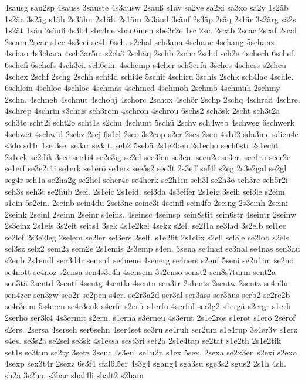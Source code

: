 {4sausg
sau2sp
4sauss
3sauste
4s3ausw
2sauß
s1av
sa2ve
sa2xi
sa3xo
sa2y
1s2äb
1s2äc
3s2äg
s1äh
2s3ähn
2s1ält
2s1äm
2s3änd
3sänf
2s3äp
2säq
2s1är
3s2ärg
sä2s
1s2ät
1säu
2säuß
4s3b4
sba4ne
sbau6men
sbe3r2e
1sc
2sc.
2scab
2scac
2scaf
2scal
2scam
2scar
s1ce
4s3cei
sc4h
6sch.
s2chal
sch3ana
4schanc
4schang
5schanz
4schao
4s3chara
4sch3ar5m
s2chä
2schäq
2schb
2schc
2schd
sch2e
4schech
6schef.
6schefi
6schefs
4sch3ei.
sch6ein.
4schemp
s4cher
sch5erfü
3sches
4schess
s2cheu
4schex
2schf
2schg
2schh
schi4d
schi4e
5schif
4schiru
3schis
2schk
sch4lac
4schle.
6schlein
4schloc
4schlöc
4schmas
4schmed
4schmoh
2schmö
4schmüh
2schmy
2schn.
4schneb
4schnut
4schobj
4schorc
2schox
4schör
2schp
2schq
4schrad
4schre.
4schrep
4schrin
s3chris
sch3rom
4schron
4schrou
6schs2
sch3sk
2scht
sch3t2a
sch3te
scht2i
scht2o
scht1s
s2chu
4schunt
5schü
2schv
sch4web
4schweg
6schwerk
4schwet
4schwid
2schz
2scj
6s1cl
2sco
3s2cop
s2cr
2scs
2scu
4s1d2
sda3me
sdien4e
s3do
sd4r
1se
3se.
se3ar
se3at.
seb2
5sebä
2s1e2ben
2s1echo
sech6str
2s1echt
2s1eck
se2dik
3see
see1i4
se2e3ig
se2el
see3len
se3en.
seen2e
se3er.
see1ra
seer2e
se1erf
se3e2r1i
se1erk
se1erö
se1ers
see5s2
see3t
2s3eff
sef4l
s2eg
2s3e2gal
se2gl
seg4r
seh1a
se2ha2g
se2hel
seher4e
se4herk
se2h1in
seh3l
se2h3ö
seh3re
seh5r2i
seh3s
seh3t
se2hüb
2sei.
2s1eic
2s1eid.
sei3da
4s3eifer
2s1eig
3seih
sei3le
s2eim
s1ein
5s2ein.
2seinb
sein4du
2sei3ne
seine3i
4seinfl
sein4fo
2seing
2s3einh
2seini
2seink
2seinl
2seinn
2seinr
s4eins.
4seinsc
4seinsp
sein8stit
sein6str
4seintr
2seinw
2s3einz
2s1eis
3s2eit
seits1
3sek
4s1e2kel
4sekz
s2el.
se2l1a
se3lad
3s2elb
sel1ec
se2lef
2s3e2leg
2selem
se2ler
sel3ers
2self.
s1e2lit
2s1elix
s2ell
sel3le
se2lob
s2els
sel3sz
selz2
sem2a
sem2e
2s1emis
2s3emp
s4en.
3sena
se4nad
se3nal
se4nas
sen3au
s2enb
2s1endl
sen3d4r
senen1
se4nene
4senerg
se4ners
s2enf
5seni
se2n1im
se2no
se4nott
se4noz
s2ensa
sen4s3e4h
4sensem
3s2enso
senst2
sen8s7turm
sent2a
sen3tä
2sentd
2sentf
4sentg
4sentla
4sentn
sen3tr
2s1ents
2sentw
2sentz
se4n3u
sen4zer
sen3zw
seo2r
se2pen
s4er.
se2r3a2d
ser3al
ser3ass
ser3äus
serb2
se2re2b
se4r3eim
5s4eren
se4r3enk
s4erfe
s2erfr
s1erfü
4serfül
ser3g2
s1ergä
s2ergr
s1erh
2serhö
ser3k4
4s3ermit
s2ern.
s1ernä
s3erneu
4s3ernt
2s1e2ros
s1erot
s1erö
2seröf
s2ers.
2sersa
4serseh
ser6sehn
4ser4set
se3ru
se4ruh
ser2um
s1e4rup
3s4er3v
s1erz
s4es.
se3s2a
se2sel
se3sk
4s1essa
sest3ri
set2a
2s1e4tap
se2tat
s1e2th
2s1e2tik
set1s
se3tun
se2ty
3setz
3seuc
4s3eul
se1u2n
s1ex
5sex.
2sexa
se2x3en
s2exi
s2exo
4sexp
sex3t4r
2sexz
6s3f4
sfal6l5er
4s3g4
sgang4
sga3su
sge3s2
sgus2
2s1h
4sh.
sh2a
3s2ha.
s3hac
shal4li
shalt2
s2ham
}
